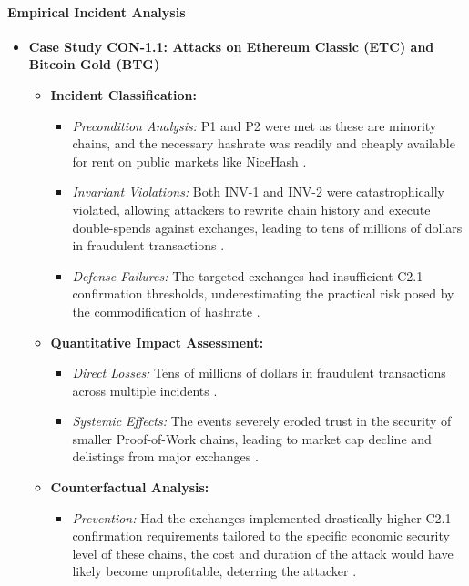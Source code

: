 \paragraph{Empirical Incident Analysis}

\begin{itemize}
    \item \textbf{Case Study CON-1.1: Attacks on Ethereum Classic (ETC) and Bitcoin Gold (BTG)}
    \begin{itemize}
        \item \textbf{Incident Classification:}
            \begin{itemize}
                \item \textit{Precondition Analysis:} P1 and P2 were met as these are minority chains, and the necessary hashrate was readily and cheaply available for rent on public markets like NiceHash \cite{casino2019, eyal2014}.
                \item \textit{Invariant Violations:} Both INV-1 and INV-2 were catastrophically violated, allowing attackers to rewrite chain history and execute double-spends against exchanges, leading to tens of millions of dollars in fraudulent transactions \cite{casino2019}.
                \item \textit{Defense Failures:} The targeted exchanges had insufficient C2.1 confirmation thresholds, underestimating the practical risk posed by the commodification of hashrate \cite{eyal2014}.
            \end{itemize}
        \item \textbf{Quantitative Impact Assessment:}
            \begin{itemize}
                \item \textit{Direct Losses:} Tens of millions of dollars in fraudulent transactions across multiple incidents \cite{casino2019}.
                \item \textit{Systemic Effects:} The events severely eroded trust in the security of smaller Proof-of-Work chains, leading to market cap decline and delistings from major exchanges \cite{casino2019, wang2019}.
            \end{itemize}
        \item \textbf{Counterfactual Analysis:}
            \begin{itemize}
                \item \textit{Prevention:} Had the exchanges implemented drastically higher C2.1 confirmation requirements tailored to the specific economic security level of these chains, the cost and duration of the attack would have likely become unprofitable, deterring the attacker \cite{eyal2014}.
            \end{itemize}
    \end{itemize}
\end{itemize}

